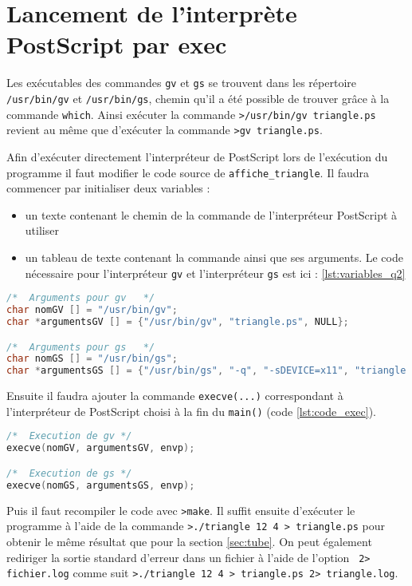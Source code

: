 \section{Lancement de l'interprète PostScript par exec}

Les exécutables des commandes \verb!gv! et \verb!gs! se trouvent dans les répertoire \verb!/usr/bin/gv! et \verb!/usr/bin/gs!, chemin qu'il a été possible de trouver grâce à la commande \verb!which!.
Ainsi exécuter la commande \verb!>/usr/bin/gv triangle.ps! revient au même que d'exécuter la commande \verb!>gv triangle.ps!.

Afin d'exécuter directement l'interpréteur de PostScript lors de l'exécution du programme il faut modifier le code source de \verb!affiche_triangle!.
Il faudra commencer par initialiser deux variables :
\begin{itemize}
	\item un texte contenant le chemin de la commande de l'interpréteur PostScript à utiliser
	\item un tableau de texte contenant la commande ainsi que ses arguments. Le code nécessaire pour l'interpréteur \verb!gv! et l'interpréteur \verb!gs! est ici : \ref{lst:variables_q2}
\end{itemize}

\begin{lstlisting}[language=C, label={lst:variables_q2}, caption=Initialisation des variables pour exec de gv et gs]
/*	Arguments pour gv	*/
char nomGV [] = "/usr/bin/gv";
char *argumentsGV [] = {"/usr/bin/gv", "triangle.ps", NULL};

/*  Arguments pour gs	*/
char nomGS [] = "/usr/bin/gs";
char *argumentsGS [] = {"/usr/bin/gs", "-q", "-sDEVICE=x11", "triangle.ps", NULL};
\end{lstlisting}

Ensuite il faudra ajouter la commande \verb!execve(...)! correspondant à l'interpréteur de PostScript choisi à la fin du \verb!main()! (code \ref{lst:code_exec}).

\begin{lstlisting}[language=C, label={lst:code_exec}, caption=Appel de la fonction execve() pour gv et gs]
/*  Execution de gv	*/
execve(nomGV, argumentsGV, envp);

/*  Execution de gs	*/
execve(nomGS, argumentsGS, envp);
\end{lstlisting}

Puis il faut recompiler le code avec \verb!>make!. Il suffit ensuite d'exécuter le programme à l'aide de la commande \verb!>./triangle 12 4 > triangle.ps! pour obtenir le même résultat que pour la section \ref{sec:tube}. On peut également rediriger la sortie standard d'erreur dans un fichier à l'aide de l'option \verb! 2> fichier.log! comme suit \verb!>./triangle 12 4 > triangle.ps 2> triangle.log!.

